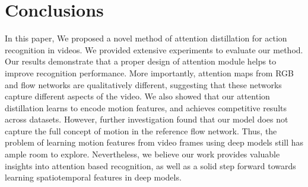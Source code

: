 \documentclass[10pt,twocolumn,letterpaper]{article}
\begin{document}
\section{Conclusions}
In this paper, We proposed a novel method of attention distillation for action recognition in videos. We provided extensive experiments to evaluate our method. Our results demonstrate that a proper design of attention module helps to improve recognition performance. More importantly, attention maps from RGB and flow networks are qualitatively different, suggesting that these networks capture different aspects of the video. We also showed that our attention distillation learns to encode motion features, and achieves competitive results across datasets. However, further investigation found that our model does not capture the full concept of motion in the reference flow network. Thus, the problem of learning motion features from video frames using deep models still has ample room to explore. Nevertheless, we believe our work provides valuable insights into attention based recognition, as well as a solid step forward towards learning spatiotemporal features in deep models.

{\small


}
\end{document}

